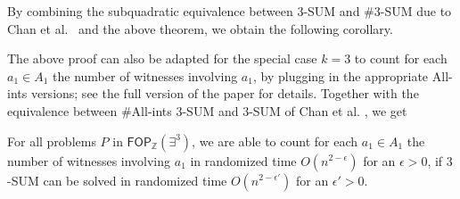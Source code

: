     \countComplete*


By combining the subquadratic equivalence between $3$-SUM and $\#3$-SUM due to Chan et al.~\cite{DBLP:journals/corr/abs-2303-14572} and the above theorem, we obtain the following corollary.
\threecountcomplete*

The above proof can also be adapted for the special case $k=3$ to count for each $a_1 \in A_1$ the number of witnesses involving $a_1$, by plugging in the appropriate All-ints versions; see the full version of the paper for details.
Together with the equivalence between $\#$All-ints $3$-SUM and $3$-SUM of Chan et al. \cite{DBLP:journals/corr/abs-2303-14572}, we get
\begin{corollary}
For all problems $P$ in $\mathsf{FOP}_{\mathbb{Z}}(\exists^3)$, we are able to count for each $a_1 \in A_1$ the number of witnesses involving $a_1$ in randomized time $O(n^{2-\epsilon})$ for an $\epsilon>0$,
if $3$-SUM can be solved in randomized time $O(n^{2-\epsilon'})$ for an $\epsilon'>0$.
\label{count-all-ints}
\end{corollary}


